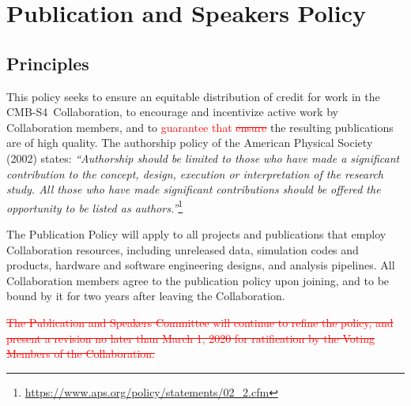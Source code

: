 \documentclass[12pt]{article}
\newcommand\collabname{CMB-S4}
\newcommand{\revision}[1]{\textcolor{Red}{#1}}
\begin{document}


%


%

\section{Publication and Speakers Policy}
\label{sec:pub}
\subsection{Principles}
This policy seeks to ensure an equitable distribution of credit for work in the \collabname\ Collaboration, to encourage and incentivize active work by Collaboration members, and to \revision{guarantee that \sout{ensure}} the resulting publications are of high quality. The authorship policy of the American Physical Society (2002) states: \textit{``Authorship should be limited to those who have made a significant contribution to the concept, design, execution or interpretation of the research study. All those who have made significant contributions should be offered the opportunity to be listed as authors.''}\footnote{\url{https://www.aps.org/policy/statements/02_2.cfm}}

The Publication Policy will apply to all projects and publications that employ Collaboration resources, including unreleased data, simulation codes and products, hardware and software
engineering designs, and analysis pipelines. All Collaboration members agree to the publication policy upon joining, and to be bound by it for two years after leaving the Collaboration.


\revision{\sout{The Publication and Speakers Committee will continue to refine the policy, and present a revision no later than March 1, 2020 for ratification by the Voting Members of the Collaboration.}}  
\end{document}
